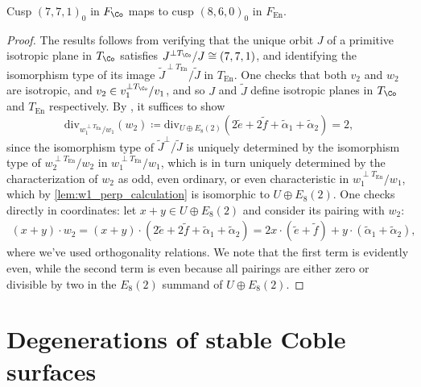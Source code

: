 \documentclass{amsart}
\renewcommand{\tilde}{\widetilde}
\begin{document}
\begin{lemma}

\label{lem:1_cusp_correspondence} Cusp \((7,7,1)_0\) in \(F_{\Co}\) maps to cusp \((8, 6, 0)_0\) in \(F_{\operatorname{En}}\).

\end{lemma}

\begin{proof}

The results follows from verifying that the unique orbit \(J\) of a primitive isotropic plane in \(T_{\Co}\) satisfies \(J^{\perp T_{\Co}}/J \cong (7,7,1)\), and identifying the isomorphism type of its image \(\tilde J^{\perp T_{\operatorname{En}}}/\tilde J\) in \(T_{\operatorname{En}}\). One checks that both \(v_2\) and \(w_2\) are isotropic, and \(v_2 \in v_1^{\perp T_{\Co}}/v_1\), and so \(J\) and \(\tilde J\) define isotropic planes in \(T_{\Co}\) and \(T_{\operatorname{En}}\) respectively. By \cite[Prop. 5.5, Lem. 5.9]{AE22nonsympinv}, it suffices to show \[
\mathrm{div}_{w_1^{\perp T_{\operatorname{En}}} /w_1}(w_2)  \coloneqq\mathrm{div}_{U \oplus E_8(2)}(2\tilde e + 2\tilde f + \tilde \alpha_1 + \tilde \alpha_2)= 2
,\] since the isomorphism type of \(\tilde J^\perp/\tilde J\) is uniquely determined by the isomorphism type of \(w_2^{\perp T_{\operatorname{En}}}/w_2\) in \(w_1^{\perp T_{\operatorname{En}}}/w_1\), which is in turn uniquely determined by the characterization of \(w_2\) as odd, even ordinary, or even characteristic in \(w_1^{\perp T_{\operatorname{En}}}/w_1\), which by \cref{lem:w1_perp_calculation} is isomorphic to \(U \oplus E_8(2)\). One checks directly in coordinates: let \(x+y\in U \oplus E_8(2)\) and consider its pairing with \(w_2\): \begin{align*} (x+y)\cdot w_2  = (x+y)\cdot (2\tilde e + 2\tilde f + \tilde \alpha_1 + \tilde \alpha_2 ) = 2x\cdot (\tilde e + \tilde f) + y\cdot (\tilde \alpha_1 + \tilde \alpha_2) ,\end{align*} where we've used orthogonality relations. We note that the first term is evidently even, while the second term is even because all pairings are either zero or divisible by two in the \(E_8(2)\) summand of \(U \oplus E_8(2)\).

\end{proof}

\section{Degenerations of stable Coble surfaces}\label{degenerations-of-stable-coble-surfaces}
\end{document}

